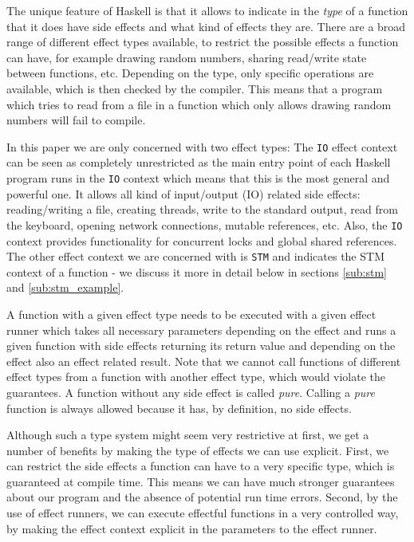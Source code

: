 The unique feature of Haskell is that it allows to indicate in the \textit{type} of a function that it does have side effects and what kind of effects they are. There are a broad range of different effect types available, to restrict the possible effects a function can have, for example drawing random numbers, sharing read/write state between functions, etc. Depending on the type, only specific operations are available, which is then checked by the compiler. This means that a program which tries to read from a file in a function which only allows drawing random numbers will fail to compile.

In this paper we are only concerned with two effect types: The \texttt{IO} effect context can be seen as completely unrestricted as the main entry point of each Haskell program runs in the \texttt{IO} context which means that this is the most general and powerful one. It allows all kind of input/output (IO) related side effects: reading/writing a file, creating threads, write to the standard output, read from the keyboard, opening network connections, mutable references, etc. Also, the \texttt{IO} context provides functionality for concurrent locks and global shared references. The other effect context we are concerned with is \texttt{STM} and indicates the STM context of a function - we discuss it more in detail below in sections \ref{sub:stm} and \ref{sub:stm_example}. 

A function with a given effect type needs to be executed with a given effect runner which takes all necessary parameters depending on the effect and runs a given function with side effects returning its return value and depending on the effect also an effect related result. Note that we cannot call functions of different effect types from a function with another effect type, which would violate the guarantees. A function without any side effect is called \textit{pure}. Calling a \textit{pure} function is always allowed because it has, by definition, no side effects. 

Although such a type system might seem very restrictive at first, we get a number of benefits by making the type of effects we can use explicit. First, we can restrict the side effects a function can have to a very specific type, which is guaranteed at compile time. This means we can have much stronger guarantees about our program and the absence of potential run time errors. Second, by the use of effect runners, we can execute effectful functions in a very controlled way, by making the effect context explicit in the parameters to the effect runner.

